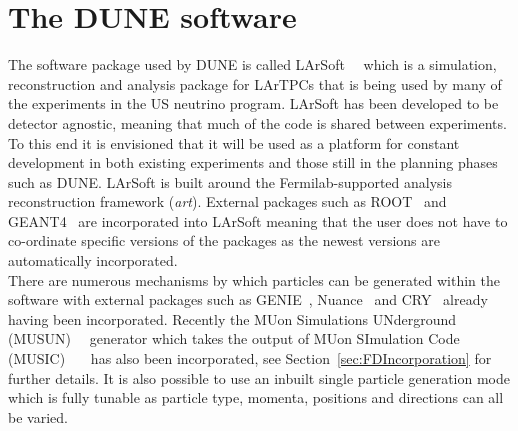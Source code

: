 \section{The DUNE software} \label{sec:LArSoft} %
The software package used by DUNE is called LArSoft~\citep{Church_LArSoft}~\citep{LArSoftOrg} which is a simulation, reconstruction and analysis package for LArTPCs that is being used by many of the experiments in the US neutrino program. LArSoft has been developed to be detector agnostic, meaning that much of the code is shared between experiments. To this end it is envisioned that it will be used as a platform for constant development in both existing experiments and those still in the planning phases such as DUNE. LArSoft is built around the Fermilab-supported analysis reconstruction framework (\emph{art}). External packages such as ROOT~\citep{ROOT} and GEANT4~\citep{GEANT4} are incorporated into LArSoft meaning that the user does not have to co-ordinate specific versions of the packages as the newest versions are automatically incorporated. \\

There are numerous mechanisms by which particles can be generated within the software with external packages such as GENIE~\citep{GENIE}, Nuance~\citep{Nuance} and CRY~\citep{CRY} already having been incorporated. Recently the MUon Simulations UNderground (MUSUN)~\citep{MUSUN}~\citep{MUSUN2} generator which takes the output of MUon SImulation Code (MUSIC)~\citep{MUSUN}~\citep{MUSIC}~\citep{MUSIC2} has also been incorporated, see Section~\ref{sec:FDIncorporation} for further details. It is also possible to use an inbuilt single particle generation mode which is fully tunable as particle type, momenta, positions and directions can all be varied. \\

